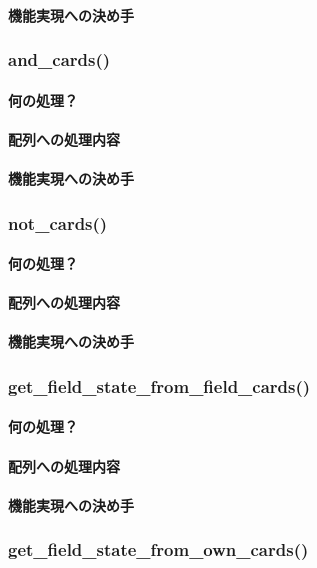 \documentclass[11pt,a4paper, uplatex]{jsarticle}
\begin{document}
\paragraph{機能実現への決め手}
%
\subsubsection{and\_cards()}
\paragraph{何の処理？}
\paragraph{配列への処理内容}
\paragraph{機能実現への決め手}
%
\subsubsection{not\_cards()}
\paragraph{何の処理？}
\paragraph{配列への処理内容}
\paragraph{機能実現への決め手}
%
\subsubsection{get\_field\_state\_from\_field\_cards()}
\paragraph{何の処理？}
\paragraph{配列への処理内容}
\paragraph{機能実現への決め手}
%
\subsubsection{get\_field\_state\_from\_own\_cards()}
\end{document}
